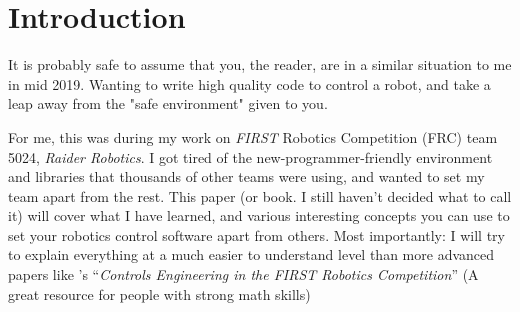 
\chapter{Introduction} %

\label{ch:introduction} %


It is probably safe to assume that you, the reader, are in a similar situation to me in mid 2019. 
Wanting to write high quality code to control a robot, and take a leap away from the "safe environment" given to you.

For me, this was during my work on \emph{FIRST} Robotics Competition (FRC) team 5024, \emph{Raider Robotics}. I got tired of 
the new-programmer-friendly environment and libraries that thousands of other teams were using, and wanted to 
set my team apart from the rest. This paper (or book. I still haven't decided what to call it) will cover 
what I have learned, and various interesting concepts you can use to set your robotics control software apart from 
others. Most importantly: I will try to explain everything at a much easier to understand level than more advanced
papers like \citeauthor{tylerveness:2020}'s ``\emph{Controls Engineering in the FIRST Robotics Competition}'' \citep{tylerveness:2020}
(A great resource for people with strong math skills)